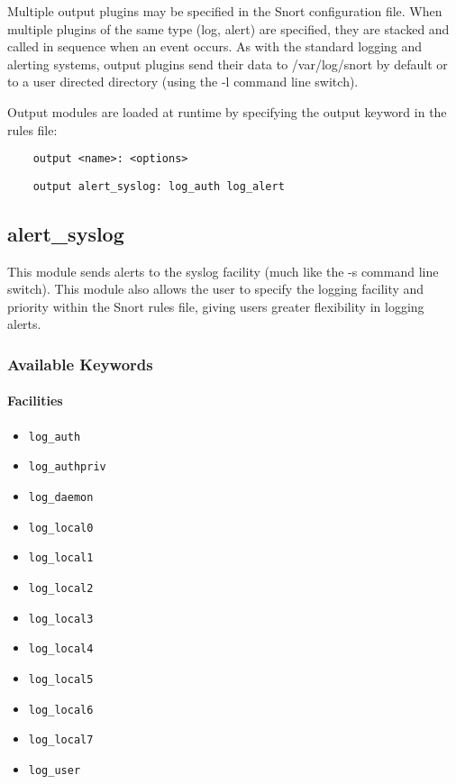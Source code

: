 \documentclass[english]{report}
\begin{document}
Multiple output plugins may be specified in the Snort configuration file. When
multiple plugins of the same type (log, alert) are specified, they are stacked
and called in sequence when an event occurs. As with the standard logging and
alerting systems, output plugins send their data to /var/log/snort by default
or to a user directed directory (using the -l command line switch).

Output modules are loaded at runtime by specifying the output keyword in the
rules file:

\begin{verbatim}
    output <name>: <options>
\end{verbatim}

\begin{verbatim}
    output alert_syslog: log_auth log_alert
\end{verbatim}

\subsection{alert\_syslog}
\label{alert syslog lable}

This module sends alerts to the syslog facility (much like the -s command line
switch). This module also allows the user to specify the logging facility and
priority within the Snort rules file, giving users greater flexibility in
logging alerts.

\subsubsection{Available Keywords}

\paragraph{Facilities}

\begin{itemize}
\item \texttt{log\_auth} 
\item \texttt{log\_authpriv} 
\item \texttt{log\_daemon}
\item \texttt{log\_local0} 
\item \texttt{log\_local1}
\item \texttt{log\_local2}
\item \texttt{log\_local3}
\item \texttt{log\_local4}
\item \texttt{log\_local5}
\item \texttt{log\_local6}
\item \texttt{log\_local7}
\item \texttt{log\_user}
\end{itemize}
\end{document}

